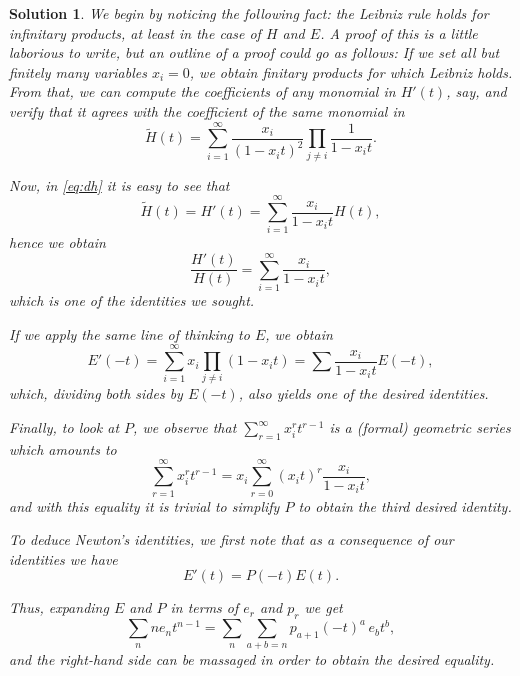 \documentclass{article}
\theoremstyle{nonumberplain}
\newtheorem{sol}{Solution}
\begin{document}
\begin{sol}
We begin by noticing the following fact: the Leibniz rule holds for infinitary products, at least in the case of $H$ and $E$. A proof of this is a little laborious to write, but an outline of a proof could go as follows: If we set all but finitely many variables $x_i = 0$, we obtain finitary products for which Leibniz holds. From that, we can compute the coefficients of any monomial in $H'(t)$, say, and verify that it agrees with the coefficient of the same monomial in
\begin{equation}\label{eq:dh}
\tilde H(t) = \sum_{i=1}^\infty \frac{x_i}{(1-x_i t)^2} \prod_{j \neq i} \frac1{1-x_i t}.
\end{equation}

Now, in \eqref{eq:dh} it is easy to see that
\begin{equation}
\tilde H(t) = H'(t) = \sum_{i=1}^\infty \frac{x_i}{1-x_i t} H(t),
\end{equation}
hence we obtain
\begin{equation}
\frac{H'(t)}{H(t)} = \sum_{i=1}^\infty \frac{x_i}{1-x_i t},
\end{equation}
which is one of the identities we sought.

If we apply the same line of thinking to $E$, we obtain
\begin{equation}
E'(-t) = \sum_{i=1}^\infty x_i \prod_{j \neq i} (1-x_i t) = \sum \frac{x_i}{1-x_i t} E(-t),
\end{equation}
which, dividing both sides by $E(-t)$, also yields one of the desired identities.

Finally, to look at $P$, we observe that $\sum_{r=1}^\infty x_i^r t^{r-1}$ is a (formal) geometric series which amounts to
\begin{equation}
\sum_{r=1}^\infty x_i^r t^{r-1} = x_i \sum_{r=0}^\infty (x_i t)^r \frac{x_i}{1-x_i t},
\end{equation}
and with this equality it is trivial to simplify $P$ to obtain the third desired identity.

\smallskip

To deduce Newton's identities, we first note that as a consequence of our identities we have
\begin{equation}
E'(t) = P(-t) E(t).
\end{equation}

Thus, expanding $E$ and $P$ in terms of $e_r$ and $p_r$ we get
\begin{equation}
\sum_n n e_n t^{n-1} = \sum_n \sum_{a+b = n} p_{a+1} (-t)^a \, e_b t^b,
\end{equation}
and the right-hand side can be massaged in order to obtain the desired equality.
\end{sol}
\end{document}
